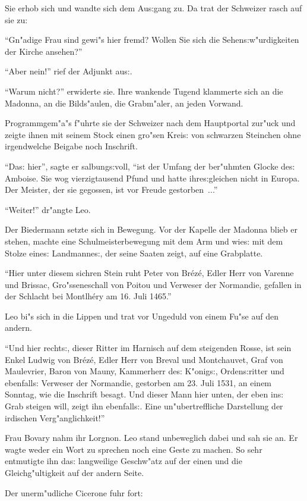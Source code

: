 \documentclass[oneside,12pt]{book}
\newcommand{\s}{s:}%
\begin{document}
Sie erhob sich und wandte sich dem Au{\s}gang zu. Da trat der
Schweizer rasch auf sie zu:

"`Gn"adige Frau sind gewi"s hier fremd? Wollen Sie sich die
Sehen{\s}w"urdigkeiten der Kirche ansehen?"'

"`Aber nein!"' rief der Adjunkt au{\s}.

"`Warum nicht?"' erwiderte sie. Ihre wankende Tugend klammerte
sich an die Madonna, an die Bilds"aulen, die Grabm"aler, an jeden
Vorwand.

Programmgem"a"s f"uhrte sie der Schweizer nach dem Hauptportal
zur"uck und zeigte ihnen mit seinem Stock einen gro"sen Krei{\s}
von schwarzen Steinchen ohne irgendwelche Beigabe noch Inschrift.

"`Da{\s} hier"', sagte er salbung{\s}voll, "`ist der Umfang der
ber"uhmten Glocke de{\s} Amboise. Sie wog vierzigtausend Pfund und
hatte ihre{\s}gleichen nicht in Europa. Der Meister, der sie
gegossen, ist vor Freude gestorben~..."'

"`Weiter!"' dr"angte Leo.

Der Biedermann setzte sich in Bewegung. Vor der Kapelle der
Madonna blieb er stehen, machte eine Schulmeisterbewegung mit dem
Arm und wie{\s} mit dem Stolze eine{\s} Landmanne{\s}, der seine
Saaten zeigt, auf eine Grabplatte.

"`Hier unter diesem sichren Stein ruht Peter von Br\'ez\'e, Edler
Herr von Varenne und Brissac, Gro"sseneschall von Poitou und
Verweser der Normandie, gefallen in der Schlacht bei Montlh\'ery
am 16. Juli 1465."'

Leo bi"s sich in die Lippen und trat vor Ungeduld von einem Fu"se
auf den andern.

"`Und hier recht{\s}, dieser Ritter im Harnisch auf dem steigenden
Rosse, ist sein Enkel Ludwig von Br\'ez\'e, Edler Herr von Breval
und Montchauvet, Graf von Maulevrier, Baron von Mauny, Kammerherr
de{\s} K"onig{\s}, Orden{\s}ritter und ebenfall{\s} Verweser der
Normandie, gestorben am 23. Juli 1531, an einem Sonntag, wie die
Inschrift besagt. Und dieser Mann hier unten, der eben in{\s} Grab
steigen will, zeigt ihn ebenfall{\s}. Eine un"ubertreffliche
Darstellung der irdischen Verg"anglichkeit!"'

Frau Bovary nahm ihr Lorgnon. Leo stand unbeweglich dabei und sah
sie an. Er wagte weder ein Wort zu sprechen noch eine Geste zu
machen. So sehr entmutigte ihn da{\s} langweilige Geschw"atz auf
der einen und die Gleichg"ultigkeit auf der andern Seite.

Der unerm"udliche Cicerone fuhr fort:
\end{document}
